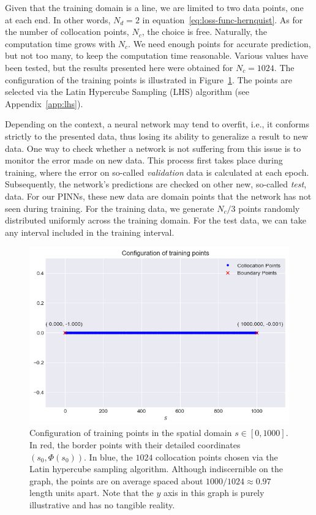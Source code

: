 Given that the training domain is a line, we are limited to two data points, one at each end. In other words, $N_d = 2$ in equation~\eqref{eq:loss-func-hernquist}. As for the number of collocation points, $N_c$, the choice is free. Naturally, the computation time grows with $N_c$. We need enough points for accurate prediction, but not too many, to keep the computation time reasonable. Various values have been tested, but the results presented here were obtained for $N_c = 1024$. The configuration of the training points is illustrated in Figure~\ref{fig:training-points-hernquist}. The points are selected via the Latin Hypercube Sampling (LHS) algorithm (see Appendix~\ref{app:lhs}). 

Depending on the context, a neural network may tend to overfit, i.e., it conforms strictly to the presented data, thus losing its ability to generalize a result to new data. One way to check whether a network is not suffering from this issue is to monitor the error made on new data. This process first takes place during training, where the error on so-called \emph{validation} data is calculated at each epoch. Subsequently, the network's predictions are checked on other new, so-called \emph{test}, data. For our PINNs, these new data are domain points that the network has not seen during training. For the training data, we generate $N_c / 3$ points randomly distributed uniformly across the training domain. For the test data, we can take any interval included in the training interval.

\begin{figure}
    \centering
    \includegraphics[width=\textwidth]{imgs/training-points-hernquist.png}
    \caption{Configuration of training points in the spatial domain $s \in [0, 1000]$. In red, the border points with their detailed coordinates $(s_0, \Phi(s_0))$. In blue, the $1024$ collocation points chosen via the Latin hypercube sampling algorithm. Although indiscernible on the graph, the points are on average spaced about $1000/1024 \approx 0.97$ length units apart. Note that the $y$ axis in this graph is purely illustrative and has no tangible reality.}
\label{fig:training-points-hernquist}
\end{figure}

